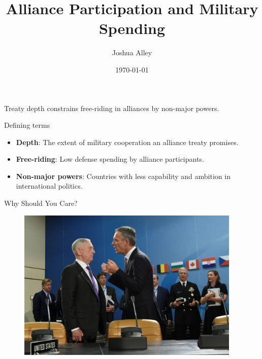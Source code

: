 \documentclass[12pt]{beamer}
\title{Alliance Participation and Military Spending}
\date{\today}
\author{Joshua Alley}
\institute{Texas A\&M University}
\begin{document}
 \maketitle




 \begin{frame}[standout]

Treaty depth constrains free-riding in alliances by non-major powers.  

 \end{frame}
 
 
 \begin{frame}{Defining terms} 

\begin{itemize}
\item \textbf{Depth}: The extent of military cooperation an alliance treaty promises.
\pause  
\item \textbf{Free-riding}: Low defense spending by alliance participants. 
\pause 
\item \textbf{Non-major powers}: Countries with less capability and ambition in international politics. 
\end{itemize}

 \end{frame}




\begin{frame}{Why Should You Care?}

\begin{figure}[htbp]
	\centering
		\includegraphics[width=0.95\textwidth]{mattis-nato.jpg}
	\label{fig:mattis-nato}
\end{figure}


\end{frame}
\end{document}
